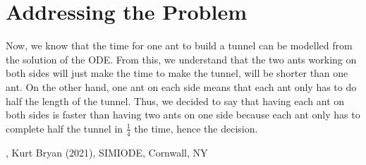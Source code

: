 \documentclass{article}
\begin{document}
\section{Addressing the Problem}
Now, we know that the time for one ant to build a tunnel can be modelled from the solution of the ODE. From this, we understand that the two ants working on both sides will just make the time to make the tunnel, will be shorter than one ant. On the other hand, one ant on each side means that each ant only has to do half the length of the tunnel. Thus, we decided to say that having each ant on both sides is faster than having two ants on one side because each ant only has to complete half the tunnel in $\frac{1}{4}$ the time, hence the decision.
\begin{thebibliography}
,
Kurt Bryan (2021), SIMIODE, Cornwall, NY
\end{thebibliography}
\end{document}
